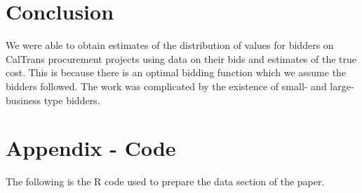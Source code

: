 \section{Conclusion}

We were able to obtain estimates of the distribution of values for bidders
on CalTrans procurement projects using data on their bids and estimates of
the true cost. This is because there is an optimal bidding function which we
assume the bidders followed. The work was complicated by the existence of
small- and large-business type bidders.

\section{Appendix - Code}

The following is the R code used to prepare the data section of the paper.

%


